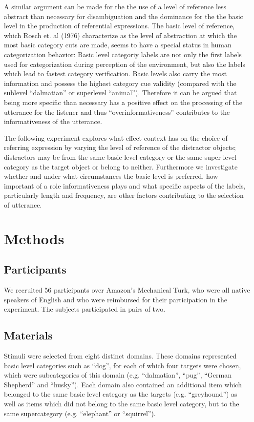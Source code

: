 \documentclass[10pt,letterpaper]{article}
\begin{document}
A similar argument can be made for the the use of a level of reference less abstract than necessary for disambiguation and the dominance for the the basic level in the production of referential expressions. The basic level of reference, which Rosch et. al (1976) characterize as the level of abstraction at which the most basic category cuts are made, seems to have a special status in human categorization behavior: Basic level categoriy labels are not only the first labels used for categorization during perception of the environment, but also the labels which lead to fastest category verification. Basic levels also carry the most information and possess the highest category cue validity (compared with the sublevel ``dalmatian'' or superlevel ``animal''). Therefore it can be argued that being more specific than necessary has a positive effect on the processing of the utterance for the listener and thus ``overinformativeness'' contributes to the informativeness of the utterance.

The following experiment explores what effect context has on the choice of referring expression by varying the level of reference of the distractor objects; distractors may be from the same basic level category or the same super level category as the target object or belong to neither. Furthermore we investigate whether and under what circumstances the basic level is preferred, how important of a role informativeness plays and what specific aspects of the labels, particularly length and frequency, are other factors contributing to the selection of utterance. 

\section{\bf Methods}

\subsection{\bf Participants}
We recruited 56 participants over Amazon’s Mechanical Turk, who were all native speakers of English and who were reimbursed for their participation in the experiment. The subjects participated in pairs of two.

\subsection{\bf Materials}
Stimuli were selected from eight distinct domains. These domains represented basic level categories such as ``dog'', for each of which four targets were chosen, which were subcategories of this domain (e.g. ``dalmatian'', ``pug'', ``German Shepherd'' and ``husky''). Each domain also contained an additional item which belonged to the same basic level category as the targets (e.g. ``greyhound'') as well as items which did not belong to the same basic level category, but to the same supercategory (e.g. ``elephant'' or ``squirrel''). 
\end{document}
